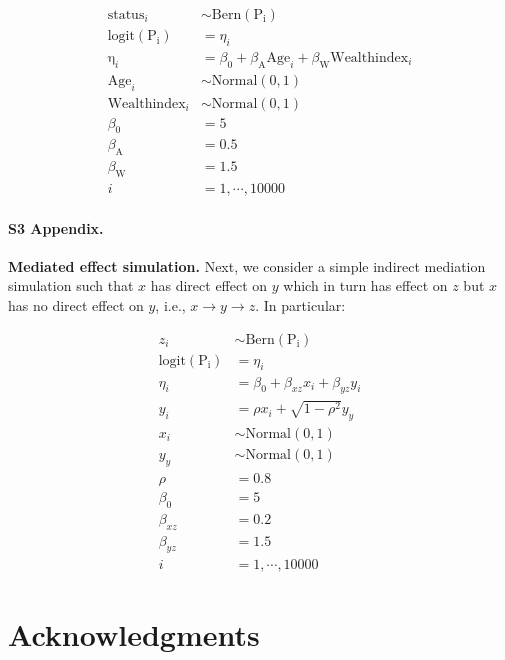 \begin{align}\label{sim:glm_two_pred}
\mathrm{status}_i &\sim \mathrm{Bern}(\mathrm{P_i}) \nonumber\\
\mathrm{logit}(\mathrm{P_i}) &= \eta_i \nonumber\\
\mathrm{\eta}_i &= \beta_0 + \beta_{\mathrm{A}}\mathrm{Age}_i + \beta_{\mathrm{W}}\mathrm{Wealthindex}_i \nonumber\\
\mathrm{Age}_i &\sim \mathrm{Normal}(0, 1) \nonumber\\
\mathrm{Wealthindex}_i &\sim \mathrm{Normal}(0, 1) \nonumber\\
\beta_0 &= 5 \nonumber\\
\beta_{\mathrm{A}} &= 0.5 \nonumber\\
\beta_{\mathrm{W}} &= 1.5 \nonumber\\
i &= 1,\cdots, 10000
\end{align}

\paragraph*{S3 Appendix.}
\label{S3_Appendix}
{\bf Mediated effect simulation.} Next, we consider a simple indirect mediation simulation such that $x$ has direct effect on $y$ which in turn has effect on $z$ but $x$ has no direct effect on $y$, i.e., $x \rightarrow y \rightarrow z$. In particular:

\begin{align}\label{sim:simple_mediate}
z_i &\sim \mathrm{Bern}(\mathrm{P_i}) \nonumber\\
\mathrm{logit}(\mathrm{P_i}) &= \eta_i \nonumber\\
\eta_i &= \beta_0 + \beta_{xz} x_i + \beta_{yz} y_i \nonumber\\
y_i &= \rho x_i + \sqrt{1-\rho^2} y_y \nonumber\\
x_i &\sim \mathrm{Normal(0, 1)} \nonumber\\
y_y &\sim \mathrm{Normal(0, 1)} \nonumber\\
\rho &= 0.8 \nonumber\\
\beta_0 &= 5 \nonumber\\
\beta_{xz} &= 0.2 \nonumber\\
\beta_{yz} &= 1.5 \nonumber\\
i &= 1,\cdots, 10000
\end{align}


\section*{Acknowledgments}

